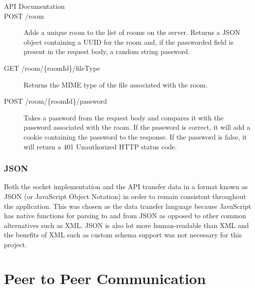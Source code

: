 \documentclass[]{report}
\begin{document}
				\begin{description}
					\item [API Documentation]
				
					\item[POST /room] 
					Adds a unique room to the list of rooms on the server. Returns a JSON object containing a UUID for the room and, if the passworded field is present in the request body, a random string password.
						
					\item[GET /room/\{roomId\}/fileType] 
					Returns the MIME type of the file associated with the room.
					
					\item[POST /room/\{roomId\}/password] 
					Takes a password from the request body and compares it with the password associated with the room. If the password is correct, it will add a cookie containing the password to the response. If the password is false, it will return a 401 Unauthorized HTTP status code.
					
				\end{description}
				
				\subsubsection{JSON}
				Both the socket implementation and the API transfer data in a format known as JSON (or JavaScript Object Notation) in order to remain consistent throughout the application. This was chosen as the data transfer language because JavaScript has native functions for parsing to and from JSON as opposed to other common alternatives such as XML. JSON is also lot more human-readable than XML and the benefits of XML such as custom schema support was not necessary for this project.
		
		\section{Peer to Peer Communication}
\end{document}
